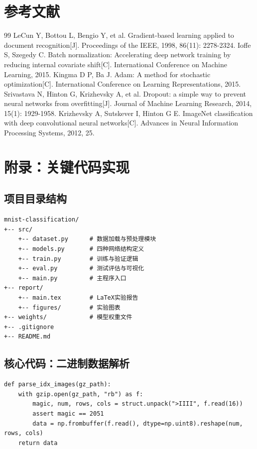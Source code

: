 \documentclass[12pt,a4paper]{ctexart}
\begin{document}
\section{参考文献}

\begin{thebibliography}{99}
 LeCun Y, Bottou L, Bengio Y, et al. Gradient-based learning applied to document recognition[J]. Proceedings of the IEEE, 1998, 86(11): 2278-2324.
 Ioffe S, Szegedy C. Batch normalization: Accelerating deep network training by reducing internal covariate shift[C]. International Conference on Machine Learning, 2015.
 Kingma D P, Ba J. Adam: A method for stochastic optimization[C]. International Conference on Learning Representations, 2015.
 Srivastava N, Hinton G, Krizhevsky A, et al. Dropout: a simple way to prevent neural networks from overfitting[J]. Journal of Machine Learning Research, 2014, 15(1): 1929-1958.
 Krizhevsky A, Sutskever I, Hinton G E. ImageNet classification with deep convolutional neural networks[C]. Advances in Neural Information Processing Systems, 2012, 25.
\end{thebibliography}

\section{附录：关键代码实现}

\subsection{项目目录结构}
\begin{lstlisting}
mnist-classification/
+-- src/
    +-- dataset.py      # 数据加载与预处理模块
    +-- models.py       # 四种网络结构定义
    +-- train.py        # 训练与验证逻辑
    +-- eval.py         # 测试评估与可视化
    +-- main.py         # 主程序入口
+-- report/
    +-- main.tex        # LaTeX实验报告
    +-- figures/        # 实验图表
+-- weights/            # 模型权重文件
+-- .gitignore
+-- README.md
\end{lstlisting}

\subsection{核心代码：二进制数据解析}
\begin{lstlisting}
def parse_idx_images(gz_path):
    with gzip.open(gz_path, "rb") as f:
        magic, num, rows, cols = struct.unpack(">IIII", f.read(16))
        assert magic == 2051
        data = np.frombuffer(f.read(), dtype=np.uint8).reshape(num, rows, cols)
    return data
\end{lstlisting}
\end{document}
